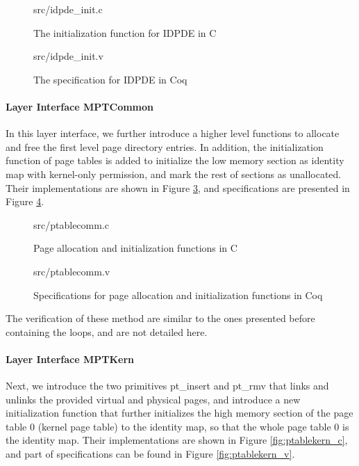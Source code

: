 \begin{figure}
	 {src/idpde_init.c}
	\caption{The initialization function for IDPDE in C}
	\label{fig:idpde_init_c}
\end{figure}

\begin{figure}
	 {src/idpde_init.v}
	\caption{The specification for IDPDE in Coq}
	\label{fig:idpde_init_v}
\end{figure}

\paragraph{Layer Interface MPTCommon}

In this layer interface, we further introduce a higher level functions to allocate and free the first level page directory entries.
In addition, the initialization function of page tables is added to initialize the low memory section as identity map with kernel-only
permission, and mark the rest of sections as unallocated.
Their implementations are shown in Figure \ref{fig:ptablecomm_c}, and specifications are presented in Figure \ref{fig:ptablecomm_v}.

\begin{figure}
	 {src/ptablecomm.c}
	\caption{Page allocation and initialization functions in C}
	\label{fig:ptablecomm_c}
\end{figure}

\begin{figure}
	 {src/ptablecomm.v}
	\caption{Specifications for page allocation and initialization functions in Coq}
	\label{fig:ptablecomm_v}
\end{figure}

The verification of these method are similar to the ones presented before containing the loops, and are not detailed here.

\paragraph{Layer Interface MPTKern}

Next, we introduce the two primitives \textsf{pt\_insert} and \textsf{pt\_rmv} that links and unlinks the provided virtual and physical
pages, and introduce a new initialization function that further initializes the high memory section of the page table 0 (kernel page table)
to the identity map, so that the whole page table 0 is the identity map. Their implementations are shown in Figure
\ref{fig:ptablekern_c}, and part of specifications can be found in Figure \ref{fig:ptablekern_v}.

